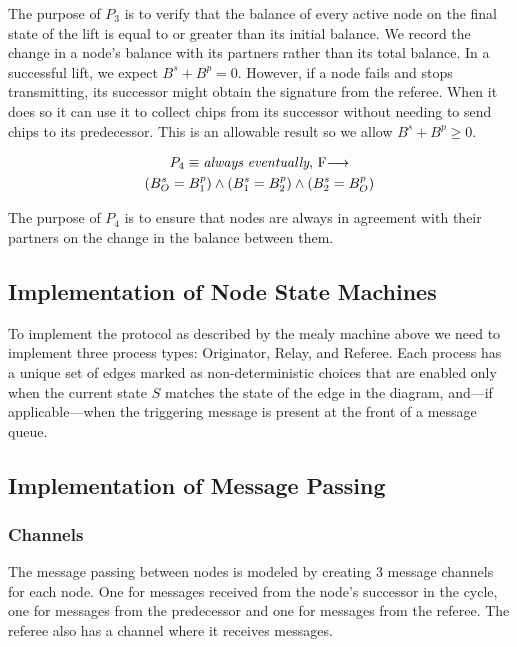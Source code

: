 \documentclass[runningheads]{llncs}
\newcommand{\originatorsuccbal}{B^s_O}
\newcommand{\relayasuccbal}{B^s_1}
\newcommand{\relaybsuccbal}{B^s_2}
\newcommand{\originatorpredbal}{B^p_O}
\newcommand{\relayapredbal}{B^p_1}
\newcommand{\relaybpredbal}{B^p_2}
\newcommand{\always}{\emph{always}}
\newcommand{\eventually}{\emph{eventually}}
\newcommand{\fair}{$F$}
\begin{document}
The purpose of $P_3$ is to verify that the balance of every active node on the final state of the lift is equal to or greater than its initial balance. We record the change in a node's balance with its partners rather than its total balance. In a successful lift, we expect $B^s + B^p = 0$. However, if a node fails and stops transmitting, its successor might obtain the signature from the referee. When it does so it can use it to collect chips from its successor without needing to send chips to its predecessor. This is an allowable result so we allow $B^s + B^p \ge 0$.

\begin{definition}[Property 4]
\begin{multline*}
P_4 \equiv \always\ \eventually,\ \fair \longrightarrow \\
    (\originatorsuccbal = \relayapredbal) \wedge
    (\relayasuccbal = \relaybpredbal) \wedge
    (\relaybsuccbal = \originatorpredbal) \\
\end{multline*}
\end{definition}


The purpose of $P_4$ is to ensure that nodes are always in agreement with their partners on the change in the balance between them. 



\subsection{Implementation of Node State Machines} 
To implement the protocol as described by the mealy machine above we need to implement three process types: Originator, Relay, and Referee. Each process has a unique set of edges marked as non-deterministic choices that are enabled only when the current state $S$ matches the state of the edge in the diagram, and---if applicable---when the triggering message is present at the front of a message queue.



\subsection{Implementation of Message Passing}
\subsubsection{Channels}
The message passing between nodes is modeled by creating 3 message channels for each node. One for messages received from the node's successor in the cycle, one for messages from the predecessor and one for messages from the referee. The referee also has a channel where it receives messages.
\end{document}
